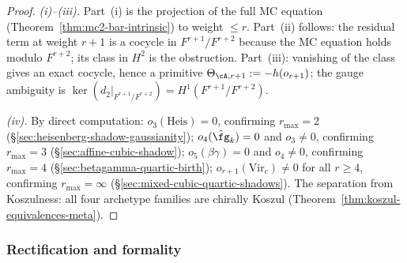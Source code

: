\begin{proof}
\emph{(i)--(iii).}
Part~(i) is the projection of the full MC equation
(Theorem~\ref{thm:mc2-bar-intrinsic}) to weight $\leq r$.
Part~(ii) follows: the residual term at weight $r+1$ is
a cocycle in $F^{r+1}/F^{r+2}$ because the MC equation
holds modulo $F^{r+2}$; its class in $H^2$ is the
obstruction.  Part~(iii): vanishing of the class gives an
exact cocycle, hence a primitive
$\Theta_{\cA,r+1} := -h(o_{r+1})$; the
gauge ambiguity is $\ker(d_2|_{F^{r+1}/F^{r+2}}) =
H^1(F^{r+1}/F^{r+2})$.

\smallskip\noindent
\emph{(iv).}
By direct computation:
$o_3(\mathrm{Heis}) = 0$, confirming $r_{\max} = 2$
(\S\ref{sec:heisenberg-shadow-gaussianity});
$o_4(\hat\fg_k) = 0$ and $o_3 \neq 0$, confirming
$r_{\max} = 3$
(\S\ref{sec:affine-cubic-shadow});
$o_5(\beta\gamma) = 0$ and $o_4 \neq 0$, confirming
$r_{\max} = 4$
(\S\ref{sec:betagamma-quartic-birth});
$o_{r+1}(\mathrm{Vir}_c) \neq 0$ for all $r \geq 4$,
confirming $r_{\max} = \infty$
(\S\ref{sec:mixed-cubic-quartic-shadows}).
The separation from Koszulness: all four
archetype families are chirally Koszul
(Theorem~\ref{thm:koszul-equivalences-meta}).
\end{proof}


\subsubsection{Rectification and formality}

